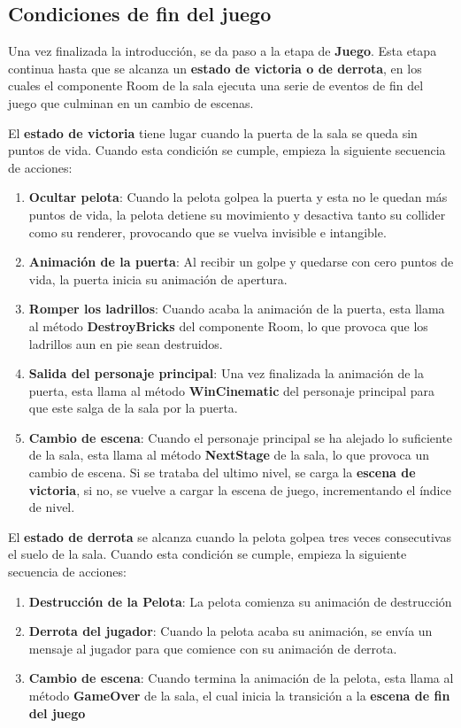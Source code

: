\subsection{Condiciones de fin del juego}
Una vez finalizada la introducción, se da paso a la etapa de \textbf{Juego}. Esta etapa continua hasta que se alcanza un \textbf{estado de victoria o de derrota}, en los cuales el componente Room de la sala ejecuta una serie de eventos de fin del juego que culminan en un cambio de escenas.

El \textbf{estado de victoria} tiene lugar cuando la puerta de la sala se queda sin puntos de vida. Cuando esta condición se cumple, empieza la siguiente secuencia de acciones:
\begin{enumerate}
\item \textbf{Ocultar pelota}: Cuando la pelota golpea la puerta y esta no le quedan más puntos de vida, la pelota detiene su movimiento y desactiva tanto su collider como su renderer, provocando que se vuelva invisible e intangible.
\item \textbf{Animación de la puerta}: Al recibir un golpe y quedarse con cero puntos de vida, la puerta inicia su animación de apertura.
\item \textbf{Romper los ladrillos}: Cuando acaba la animación de la puerta, esta llama al método \textbf{DestroyBricks} del componente Room, lo que provoca que los ladrillos aun en pie sean destruidos.
\item \textbf{Salida del personaje principal}: Una vez finalizada la animación de la puerta, esta llama al método \textbf{WinCinematic} del personaje principal para que este salga de la sala por la puerta.
\item \textbf{Cambio de escena}: Cuando el personaje principal se ha alejado lo suficiente de la sala, esta llama al método \textbf{NextStage} de la sala, lo que provoca un cambio de escena. Si se trataba del ultimo nivel, se carga la \textbf{escena de victoria}, si no, se vuelve a cargar la escena de juego, incrementando el índice de nivel.
\end{enumerate}

El \textbf{estado de derrota} se alcanza cuando la pelota golpea tres veces consecutivas el suelo de la sala. Cuando esta condición se cumple, empieza la siguiente secuencia de acciones:
\begin{enumerate}
\item \textbf{Destrucción de la Pelota}: La pelota comienza su animación de destrucción
\item \textbf{Derrota del jugador}: Cuando la pelota acaba su animación, se envía un mensaje al jugador para que comience con su animación de derrota.
\item \textbf{Cambio de escena}: Cuando termina la animación de la pelota, esta llama al método \textbf{GameOver} de la sala, el cual inicia la transición a la \textbf{escena de fin del juego}
\end{enumerate}

